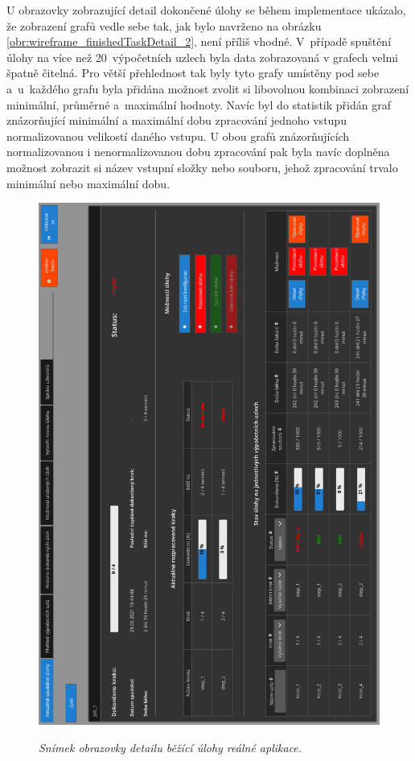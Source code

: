 U obrazovky zobrazující detail dokončené úlohy se během implementace ukázalo, že zobrazení grafů vedle sebe tak, jak bylo navrženo na obrázku \ref{obr:wireframe_finishedTaskDetail_2}, není příliš vhodné. V~případě spuštění úlohy na více než 20~výpočetních uzlech byla data zobrazovaná v grafech velmi špatně čitelná. Pro větší přehlednost tak byly tyto grafy umístěny pod sebe a~u~každého grafu byla přidána možnost zvolit si libovolnou kombinaci zobrazení minimální, průměrné a~maximální hodnoty. Navíc byl do statistik přidán graf znázorňující minimální a maximální dobu zpracování jednoho vstupu normalizovanou velikostí daného vstupu. U obou grafů znázorňujících normalizovanou i nenormalizovanou dobu zpracování pak byla navíc doplněna možnost zobrazit si název vstupní složky nebo souboru, jehož zpracování trvalo minimální nebo maximální dobu.
\enlargethispage{\baselineskip}
\begin{figure}[H]
    \begin{center}
        \scalebox{0.52}
        {
            \includegraphics{images/RunTaskDetailAppDarkScreen.pdf}
        }
        \caption{\label{obr:runTaskDetailRealApp} {\it Snímek obrazovky detailu běžící úlohy reálné aplikace.}}
    \end{center}
\end{figure}

